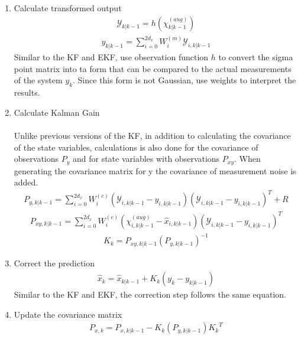 \begin{enumerate}
        \item Calculate transformed output 
         \begin{align*}
       \mathcal{Y}_{k|k-1} = h(\chi^{(aug)}_{k|k-1}) 
       \end{align*}
       \begin{align*}
       y_{k|k-1} = \sum^{2d_x}_{i = 0} W_i^{(m)}  \mathcal{Y}_{i, k | k - 1}
       \end{align*}
       Similar to the KF and EKF, use observation function $h$ to convert the sigma point matrix into ta form that can be compared to the actual measurements of the system $y_k$. Since this form is not Gaussian, use weights to interpret the results.
       
       \item Calculate Kalman Gain \\ \\
       Unlike previous versions of the KF, in addition to calculating the covariance of the state variables, calculations is also done for the covariance of observations  $P_{y}$ and for state variables with observations $P_{xy}$. When generating the covariance matrix for y the covariance of measurement noise is added. 
        \begin{align*}
       P_{y, k | k-1} = \sum^{2d_x}_{i = 0} W_i^{(c)} (\mathcal{Y}_{i, k | k - 1} -   y_{i, k | k - 1} )(\mathcal{Y}_{i, k | k - 1} -  y_{i, k | k - 1} )^T + R
       \end{align*}
        \begin{align*}
       P_{xy, k | k-1} = \sum^{2d_x}_{i = 0} W_i^{(c)} (\chi^{(aug)}_{i, k | k - 1} -  \hat x_{i, k | k - 1} )(\mathcal{Y}_{i, k | k - 1} -  y_{i, k | k - 1} )^T 
       \end{align*}
       \begin{align*}
       K_k = P_{xy, k | k-1} (P_{y, k | k-1}) ^{-1}
       \end{align*}
        
      \item Correct the prediction      
      \begin{align*}
       \hat x_{k} = \hat x_{k|k-1} + K_k(y_k - y_{k|k-1})
        \end{align*}
        Similar to the KF and EKF, the correction step follows the same equation. 
      
      
      \item Update the covariance matrix 
       \begin{align*}
       P_{x, k} = P_{x, k|k-1} -K_k (P_{y, k | k-1} ) {K_k}^T     
       \end{align*}     
            
            
            
            
            
            
            
            
            
            
            
            
            
            
            
            
            
            
    
    
        
\end{enumerate}